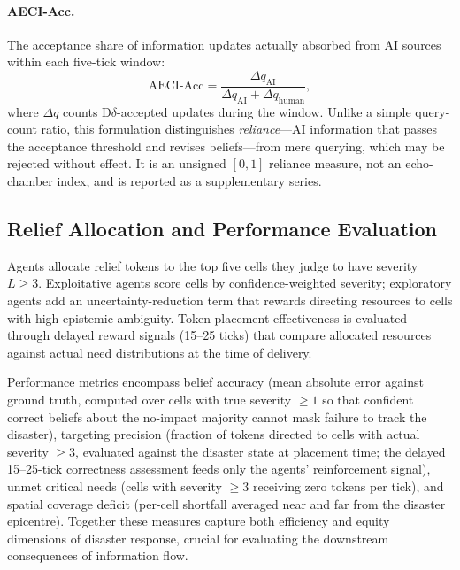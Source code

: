 \paragraph{AECI-Acc.}
The acceptance share of information updates actually absorbed from AI sources
within each five-tick window:
%
\begin{equation}
  \mathrm{AECI\text{-}Acc} = \frac{\Delta q_{\mathrm{AI}}}
                       {\Delta q_{\mathrm{AI}} + \Delta q_{\mathrm{human}}},
  \label{eq:aeci}
\end{equation}
%
where $\Delta q$ counts D$\delta$-accepted updates during the window.
Unlike a simple query-count ratio, this formulation distinguishes
\emph{reliance}---AI information that passes the acceptance threshold and
revises beliefs---from mere querying, which may be rejected without effect.
It is an unsigned $[0,1]$ reliance measure, not an echo-chamber index, and is
reported as a supplementary series.

\subsection{Relief Allocation and Performance Evaluation}

Agents allocate relief tokens to the top five cells they judge to have severity
$L\geq3$.
Exploitative agents score cells by confidence-weighted severity; exploratory agents
add an uncertainty-reduction term that rewards directing resources to cells with
high epistemic ambiguity.
Token placement effectiveness is evaluated through delayed reward signals
(15--25 ticks) that compare allocated resources against actual need distributions
at the time of delivery.

Performance metrics encompass belief accuracy (mean absolute error against ground
truth, computed over cells with true severity $\geq1$ so that confident correct
beliefs about the no-impact majority cannot mask failure to track the disaster),
targeting precision (fraction of tokens directed to cells with actual severity
$\geq3$, evaluated against the disaster state at placement time; the delayed
15--25-tick correctness assessment feeds only the agents' reinforcement signal),
unmet critical needs (cells with severity $\geq3$ receiving zero tokens per tick),
and spatial coverage deficit (per-cell shortfall averaged near and far from the
disaster epicentre).
Together these measures capture both efficiency and equity dimensions of disaster
response, crucial for evaluating the downstream consequences of information flow.

